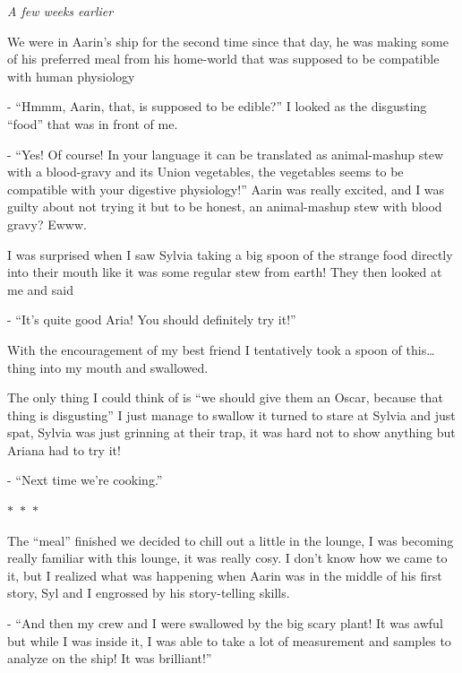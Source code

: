 \documentclass[colorlinks,12pt,a4paper]{book}
\newcommand\sep{\begin{center}
  \boldmath $\ast$~$\ast$~$\ast$
\end{center}}
\begin{document}
\textit{A few weeks earlier}\par
\bigskip

We were in Aarin's ship for the second time since that day, he was making some of his preferred meal from his home-world 
that was supposed to be compatible with human physiology\par
\bigskip

- “Hmmm, Aarin, that, is supposed to be edible?” I looked as the disgusting “food” that was in front of me.\par
\bigskip

- “Yes! Of course! In your language it can be translated as animal-mashup stew with a blood-gravy and its Union vegetables, 
the vegetables seems to be compatible with your digestive physiology!” Aarin was really excited, and I was guilty about 
not trying it but to be honest, an animal-mashup stew with blood gravy? Ewww.\par
\bigskip

I was surprised when I saw Sylvia taking a big spoon of the strange food directly into their mouth like it was some 
regular stew from earth! They then looked at me and said\par
\bigskip

- “It's quite good Aria! You should definitely try it!”\par
\bigskip

With the encouragement of my best friend I tentatively took a spoon of this… thing into my mouth and swallowed.\par
\bigskip

The only thing I could think of is “we should give them an Oscar, because that thing is disgusting” I just manage 
to swallow it turned to stare at Sylvia and just spat, Sylvia was just grinning at their trap, it was hard 
not to show anything but Ariana had to try it!\par
\bigskip

- “Next time we're cooking.”

\sep

The “meal” finished we decided to chill out a little in the lounge, I was becoming really familiar with this lounge, 
it was really cosy. I don't know how we came to it, but I realized what was happening when Aarin was in the middle of his 
first story, Syl and I engrossed by his story-telling skills.\par
\bigskip

- “And then my crew and I were swallowed by the big scary plant! It was awful but while I was inside it, I was able to 
take a lot of measurement and samples to analyze on the ship! It was brilliant!”\par
\bigskip
\end{document}
